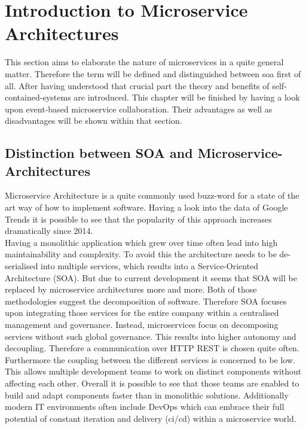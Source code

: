 \section{Introduction to Microservice  Architectures}
\label{sec:techKnowHow}
This section aims to elaborate the nature of microservices in a quite general matter. Therefore the term will be defined and distinguished between \acrfull{soa} first of all. After having understood that crucial part the theory and benefits of self-contained-systems are introduced. This chapter will be finished by having a look upon event-based microservice  collaboration. Their advantages as well as disadvantages will be shown within that section. 

\subsection{Distinction between SOA and Microservice-Architectures}
Microservice Architecture is a quite commonly used buzz-word for a state of the art way of how to implement software. Having a look into the data of Google Trends it is possible to see that the popularity of this approach increases dramatically since 2014. \cite{microservices}\newline
\\
Having a monolithic application which grew over time often lead into high maintainability and complexity. To avoid this the architecture needs to be de-serialised into multiple services, which results into a Service-Oriented Architecture (SOA). But due to current development it seems that SOA will be replaced by microservice architectures more and more.\cite{mircorVSsoa}\newline
Both of those methodologies suggest the decomposition of software. Therefore SOA focuses upon integrating those services for the entire company within a centralised management and governance. Instead, microservices focus on decomposing services without such global governance. This results into higher autonomy and decoupling.\cite{mircorVSsoa} Therefore a communication over HTTP REST is chosen quite often.\newline
Furthermore the coupling between the different services is concerned to be low. This allows multiple development teams to work on distinct components without affecting each other. Overall it is possible to see that those teams are enabled to build and adapt components faster than in monolithic solutions. Additionally  modern IT environments often include DevOps which can embrace their full potential of constant iteration and delivery (\acrshort{ci/cd}) within a microservice  world. \cite{redHatMicroservices}\newline
